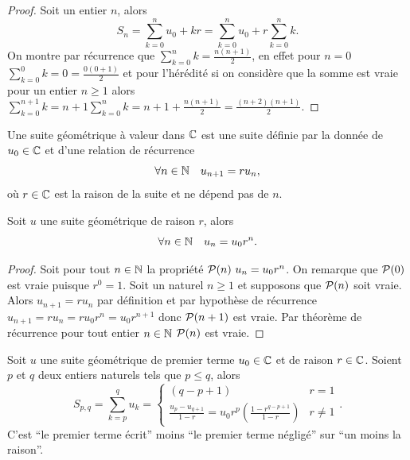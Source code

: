 \begin{proof}
  Soit un entier \(n\), alors
  \begin{equation}
    S_n = \sum_{k = 0}^n u_0 + kr= \sum_{k = 0}^n u_0 + r\sum_{k = 0}^n k.
  \end{equation}
  On montre par récurrence que \(\sum_{k = 0}^n k = \frac{n(n + 1)}{2}\), en effet 
  pour \(n = 0\) \(\sum_{k = 0}^0 k = 0 = \frac{0(0 + 1)}{2}\) et pour l'hérédité si on 
  considère que la somme est vraie pour un entier \(n \geqslant 1\) alors 
  \(\sum_{k = 0}^{n + 1} k= n + 1 \sum_{k = 0}^n 
  k = n + 1 + \frac{n(n + 1)}{2}=\frac{(n + 2)(n + 1)}{2}\).
\end{proof}

\begin{defdef}
  Une suite géométrique à valeur dans \(\C\) est une suite définie par la donnée 
  de \(u_0\in\C\) et d'une relation de récurrence
  \begin{equation}
    \forall n \in \N \quad u_{n + 1}=ru_n,
  \end{equation}
  où \(r\in\C\) est la raison de la suite et ne dépend pas de \(n\).
\end{defdef}

\begin{prop}
  Soit \(u\) une suite géométrique de raison \(r\), alors
  \begin{equation}
    \forall n \in \N \quad u_n = u_0r^n.
  \end{equation}
\end{prop}

\begin{proof}
  Soit pour tout \(n\in\N\) la propriété \(\P(n)\ u_n = u_0r^n\). On remarque que 
  \(\P(0)\) est vraie puisque \(r^0 = 1\). Soit un naturel \(n\geqslant 1\) et 
  supposons que \(\P(n)\) soit vraie. Alors \(u_{n + 1}=r u_n\) par définition et 
  par hypothèse de récurrence \(u_{n + 1}=r u_n = r u_0 r^n = u_0 r^{n + 1}\) donc 
  \(\P(n + 1)\) est vraie. Par théorème de récurrence pour tout entier \(n\in\N\) 
  \(\P(n)\) est vraie.
\end{proof}

\begin{prop}
  Soit \(u\) une suite géométrique de premier terme \(u_0\in\C\) et de raison 
  \(r\in\C\). Soient \(p\) et \(q\) deux entiers naturels tels que \(p\leqslant 
  q\), alors
  \begin{equation}
    S_{p, q}=\sum_{k = p}^q u_k=
    \begin{cases}
      (q - p + 1) & r = 1 \\
      \frac{u_p - u_{q + 1}}{1 - r}=u_0r^p\left(\frac{1 - r^{q - p + 1}}{1 - r}\right) & r 
      \neq 1
    \end{cases}.
  \end{equation}
  C'est ``le premier terme écrit'' moins ``le premier terme négligé'' sur ``un 
  moins la raison''.
\end{prop}

